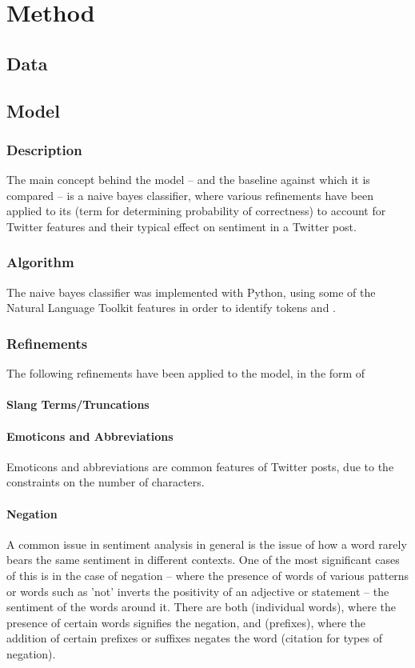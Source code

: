 \documentclass{acm_proc_article-sp}
\begin{document}
\section{Method}
	\subsection{Data}
	\subsection{Model}
		\subsubsection{Description}
		The main concept behind the model -- and the baseline against which it is compared -- is a naive bayes classifier, where various refinements have been applied to its (term for determining probability of correctness) to account for Twitter features and their typical effect on sentiment in a Twitter post.
		\subsubsection{Algorithm}
		The naive bayes classifier was implemented with Python, using some of the Natural Language Toolkit features in order to identify tokens and .
		\subsubsection{Refinements}
		The following refinements have been applied to the model, in the form of 
			\paragraph{Slang Terms/Truncations}
			\paragraph{Emoticons and Abbreviations}
			Emoticons and abbreviations are common features of Twitter posts, due to the constraints on the number of characters.
			\paragraph{Negation}
			A common issue in sentiment analysis in general is the issue of how a word rarely bears the same sentiment in different contexts. One of the most significant cases of this is in the case of negation -- where the presence of words of various patterns or words such as 'not' inverts the positivity of an adjective or statement -- the sentiment of the words around it. There are both (individual words), where the presence of certain words signifies the negation, and (prefixes), where the addition of certain prefixes or suffixes negates the word (citation for types of negation).
			
\end{document}
